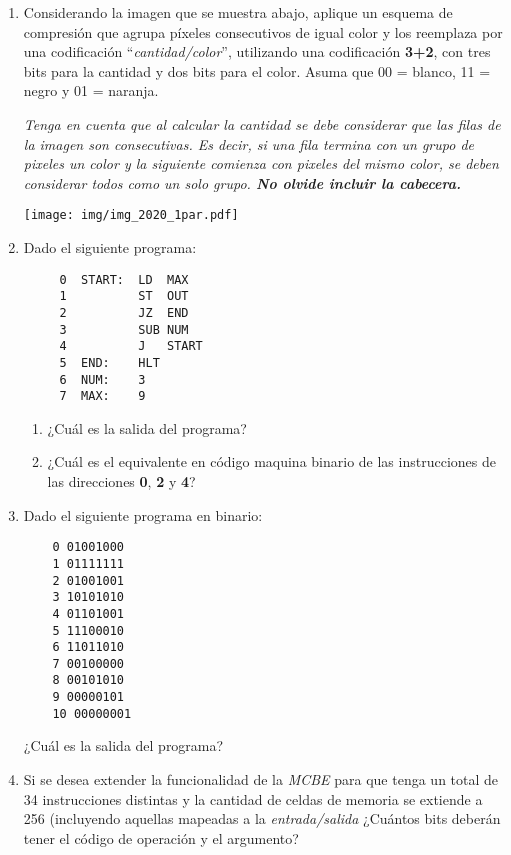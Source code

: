 \documentclass[12pt]{article}
\begin{document}
\begin{enumerate}
    \item Considerando la imagen que se muestra abajo, aplique un esquema de
        compresión que agrupa píxeles consecutivos de igual color y los
        reemplaza por una codificación ``\emph{cantidad/color}'', utilizando
        una codificación \textbf{3+2}, con tres bits para la cantidad y dos
        bits para el color. Asuma que 00 = blanco, 11 = negro y 01 = naranja.

        \textit{Tenga en cuenta que al calcular la cantidad se debe considerar
        que las filas de la imagen son consecutivas. Es decir, si una fila
        termina con un grupo de pixeles un color y la siguiente comienza con
        pixeles del mismo color, se deben considerar todos como un solo grupo.
        \textbf{No olvide incluir la cabecera.}}

    \texttt{[image: img/img\_2020\_1par.pdf]}

    \item Dado el siguiente programa:

        \begin{verbatim}
     0  START:  LD  MAX
     1          ST  OUT
     2          JZ  END
     3          SUB NUM
     4          J   START
     5  END:    HLT
     6  NUM:    3
     7  MAX:    9
        \end{verbatim}

        \begin{enumerate}

            \item ¿Cuál es la salida del programa?


            \item ¿Cuál es el equivalente en código maquina binario de las
                instrucciones de las direcciones \textbf{0}, \textbf{2} y
                \textbf{4}?

        \end{enumerate}

    \item Dado el siguiente programa en binario:

        \begin{verbatim}
    0 01001000
    1 01111111
    2 01001001
    3 10101010
    4 01101001
    5 11100010
    6 11011010
    7 00100000
    8 00101010
    9 00000101
    10 00000001
        \end{verbatim}

        ¿Cuál es la salida del programa?

    \item Si se desea extender la funcionalidad de la \emph{MCBE} para que
        tenga un total de 34 instrucciones distintas y la cantidad de celdas
        de memoria se extiende a 256 (incluyendo aquellas mapeadas a la
        \emph{entrada/salida} ¿Cuántos bits deberán tener el código de
        operación y el argumento?

\end{enumerate}
\end{document}
